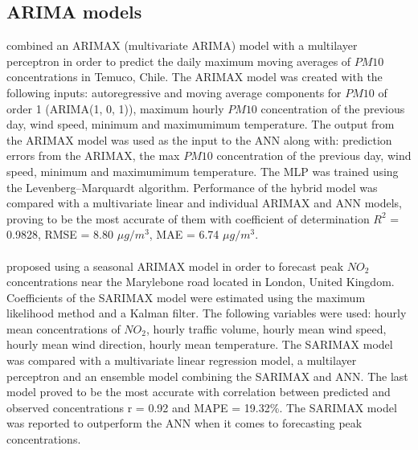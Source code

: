 \subsection{ARIMA models}
\cite{DIAZROBLES20088331} combined an ARIMAX (multivariate ARIMA) model with a multilayer perceptron in order to predict the daily maximum moving averages of $PM10$ concentrations in Temuco, Chile. The ARIMAX model was created with the following inputs: autoregressive and moving average components for $PM10$ of order 1 (ARIMA(1, 0, 1)), maximum hourly $PM10$ concentration of the previous day, wind speed, minimum and maximumimum temperature. The output from the ARIMAX model was used as the input to the ANN along with: prediction errors from the ARIMAX, the max $PM10$ concentration of the previous day, wind speed, minimum and maximumimum temperature. The MLP was trained using the Levenberg–Marquardt algorithm. Performance of the hybrid model was compared with a multivariate linear and individual ARIMAX and ANN models, proving to be the most accurate of them with coefficient of determination $R^2$ = 0.9828, RMSE = 8.80 $\mu g / m^3$, MAE = 6.74 $\mu g / m^3$. 
\\\\
\cite{CATALANO201669} proposed using a seasonal ARIMAX model in order to forecast peak $NO_2$ concentrations near the Marylebone road located in London, United Kingdom. Coefficients of the SARIMAX model were estimated using the maximum likelihood method and a Kalman filter. The following variables were used: hourly mean concentrations of $NO_2$, hourly traffic volume, hourly mean wind speed, hourly mean wind direction, hourly mean temperature. The SARIMAX model was compared with a multivariate linear regression model, a multilayer perceptron and an ensemble model combining the SARIMAX and ANN. The last model proved to be the most accurate with correlation between predicted and observed concentrations r = 0.92 and MAPE = 19.32\%. The SARIMAX model was reported to outperform the ANN when it comes to forecasting peak concentrations.

